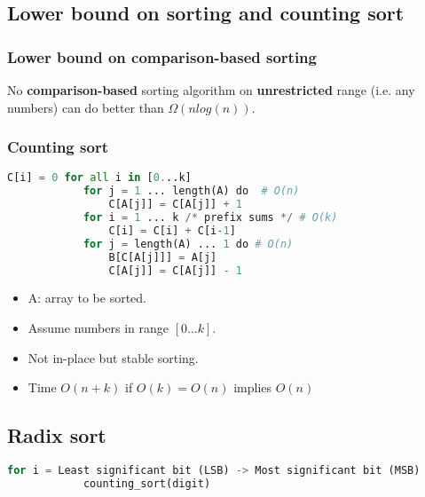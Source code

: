 \subsection{Lower bound on sorting and counting sort}
    \subsubsection{Lower bound on comparison-based sorting}
    \begin{definition}
        No \textbf{comparison-based} sorting algorithm on \textbf{unrestricted} range (i.e. any numbers) can do better than $\Omega(nlog(n))$.    
    \end{definition}

    \subsubsection{Counting sort}
    \begin{definition}
        \begin{lstlisting}[language=Python, caption={Counting Sort Pseudocode}]
            C[i] = 0 for all i in [0...k]
            for j = 1 ... length(A) do  # O(n)
                C[A[j]] = C[A[j]] + 1
            for i = 1 ... k /* prefix sums */ # O(k)
                C[i] = C[i] + C[i-1]
            for j = length(A) ... 1 do # O(n)
                B[C[A[j]]] = A[j]
                C[A[j]] = C[A[j]] - 1 
        \end{lstlisting}
        \begin{itemize}
            \item A: array to be sorted. 
            \item Assume numbers in range $[0...k]$.
            \item Not in-place but stable sorting. 
            \item Time $O(n+k)$ if $O(k) = O(n)$ implies $O(n)$
        \end{itemize}
    \end{definition}




\subsection{Radix sort}
\begin{definition}
    \begin{lstlisting}[language=Python, caption={Radix Sort Pseudocode}]
        for i = Least significant bit (LSB) -> Most significant bit (MSB)
            counting_sort(digit)
    \end{lstlisting}
\end{definition}

